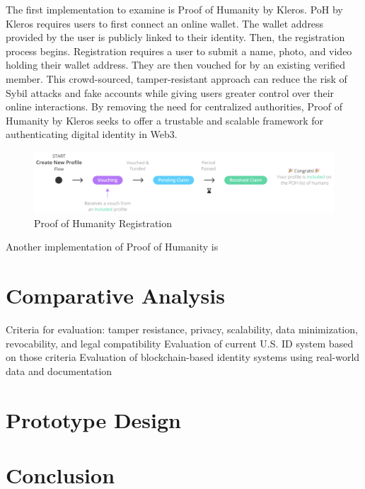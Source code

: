 \documentclass[conference]{IEEEtran}
\begin{document}
The first implementation to examine is Proof of Humanity by Kleros. PoH by Kleros requires users to first connect an online wallet. The wallet address provided by the user is publicly linked to their identity. Then, the registration process begins. Registration requires a user to submit a name, photo, and video holding their wallet address. They are then vouched for by an existing verified member. This crowd-sourced, tamper-resistant approach can reduce the risk of Sybil attacks and fake accounts while giving users greater control over their online interactions. By removing the need for centralized authorities, Proof of Humanity by Kleros seeks to offer a trustable and scalable framework for authenticating digital identity in Web3.

\begin{figure}[h!]
    \centering
    \includegraphics[width=0.9\linewidth]{poh-kleros.png}
    \caption{Proof of Humanity Registration}
    \label{fig:poh-kleros}
\end{figure}

Another implementation of Proof of Humanity is 


\section{Comparative Analysis}
Criteria for evaluation: tamper resistance, privacy, scalability, data minimization, revocability, and legal compatibility
Evaluation of current U.S. ID system based on those criteria
Evaluation of blockchain-based identity systems using real-world data and documentation

\section{Prototype Design}

\section{Conclusion}
\end{document}
